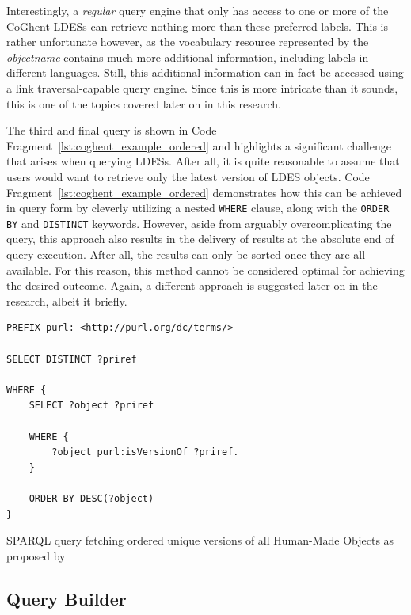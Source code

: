 Interestingly, a \textit{regular} query engine that only has access to one or more of the CoGhent LDESs can retrieve nothing more than these preferred labels. This is rather unfortunate however, as the vocabulary resource represented by the \textit{objectname} contains much more additional information, including labels in different languages. Still, this additional information can in fact be accessed using a link traversal-capable query engine. Since this is more intricate than it sounds, this is one of the topics covered later on in this research.

The third and final query is shown in Code Fragment~\ref{lst:coghent_example_ordered} and highlights a significant challenge that arises when querying LDESs. After all, it is quite reasonable to assume that users would want to retrieve only the latest version of LDES objects. Code Fragment~\ref{lst:coghent_example_ordered} demonstrates how this can be achieved in query form by cleverly utilizing a nested \texttt{WHERE} clause, along with the \texttt{ORDER BY} and \texttt{DISTINCT} keywords. However, aside from arguably overcomplicating the query, this approach also results in the delivery of results at the absolute end of query execution. After all, the results can only be sorted once they are all available. For this reason, this method cannot be considered optimal for achieving the desired outcome. Again, a different approach is suggested later on in the research, albeit it briefly. \citep{floreverk2022queries}

\begin{listing}[htbp]
    \begin{verbatim}
PREFIX purl: <http://purl.org/dc/terms/>

SELECT DISTINCT ?priref

WHERE {
    SELECT ?object ?priref
    
    WHERE { 
        ?object purl:isVersionOf ?priref.
    }
    
    ORDER BY DESC(?object)
}
    \end{verbatim}
    \caption{SPARQL query fetching ordered unique versions of all Human-Made Objects as proposed by \citet{floreverk2022queries}}
    \label{lst:coghent_example_ordered}
\end{listing}

\subsection{Query Builder}
\label{subsec:coghent_query_builder}

